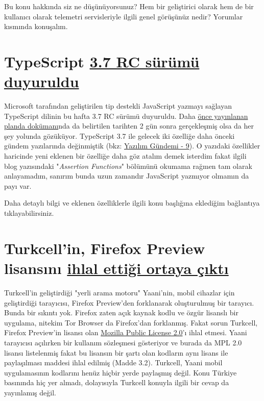\documentclass[11pt]{article}
\begin{document}
Bu konu hakkında siz ne düşünüyorsunuz? Hem bir geliştirici olarak hem de bir
kullanıcı olarak telemetri servisleriyle ilgili genel görüşünüz nedir? Yorumlar
kısmında konuşalım.
\section{TypeScript \href{https://devblogs.microsoft.com/typescript/announcing-typescript-3-7-rc/}{3.7 RC sürümü duyuruldu}}
\label{sec:org4f8c36f}
Microsoft tarafından geliştirilen tip destekli JavaScript yazmayı sağlayan
TypeScript dilinin bu hafta 3.7 RC sürümü duyuruldu. Daha \href{https://github.com/microsoft/TypeScript/issues/33352}{önce yayınlanan
planda dokümanı}nda da belirtilen tarihten 2 gün sonra gerçekleşmiş olsa da her
şey yolunda gözüküyor. TypeScript 3.7 ile gelecek iki özelliğe daha önceki
gündem yazılarında değinmiştik (bkz: \href{../09/yazilim-gundemi-09.pdf}{Yazılım Gündemi - 9}). O yazıdaki
özellikler haricinde yeni eklenen bir özelliğe daha göz atalım demek isterdim
fakat ilgili blog yazısındaki "\emph{Assertion Functions}" bölümünü okumama rağmen
tam olarak anlayamadım, sanırım bunda uzun zamandır JavaScript yazmıyor
olmamın da payı var.

Daha detaylı bilgi ve eklenen özelliklerle ilgili konu başlığına eklediğim
bağlantıya tıklayabilirsiniz.
\section{Turkcell'in, Firefox Preview lisansını \href{https://twitter.com/FirefoxPreview/status/1187461728709173254?s=20}{ihlal ettiği ortaya çıktı}}
\label{sec:orgdbe593b}
Turkcell'in geliştirdiği "yerli arama motoru" Yaani'nin, mobil cihazlar için
geliştirdiği tarayıcısı, Firefox Preview'den forklanarak oluşturulmuş bir
tarayıcı. Bunda bir sıkıntı yok. Firefox zaten açık kaynak kodlu ve özgür
lisanslı bir uygulama, nitekim Tor Browser da Firefox'dan forklanmış. Fakat
sorun Turkcell, Firefox Preview'in lisansı olan \href{https://www.mozilla.org/en-US/MPL/2.0/}{Mozilla Public License 2.0}'ı
ihlal etmesi. Yaani tarayıcısı açılırken bir kullanım sözleşmesi gösteriyor ve
burada da MPL 2.0 lisansı listelenmiş fakat bu lisansın bir şartı olan kodların
aynı lisans ile paylaşılması maddesi ihlal edilmiş (Madde 3.2). Turkcell, Yaani
mobil uygulamasının kodlarını henüz hiçbir yerde paylaşmış değil. Konu Türkiye
basınında hiç yer almadı, dolayısıyla Turkcell konuyla ilgili bir cevap da
yayınlamış değil.
\end{document}
